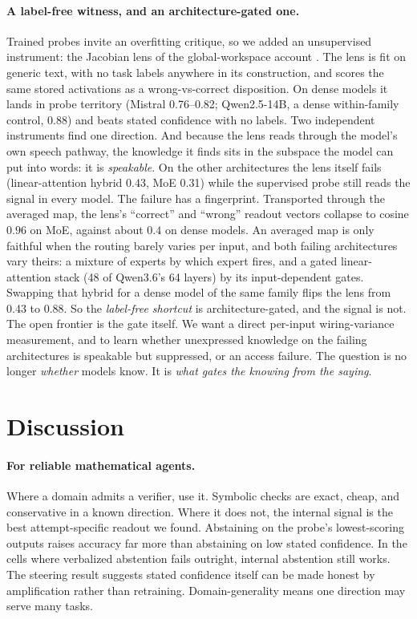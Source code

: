 \documentclass{article}
\begin{document}
\paragraph{A label-free witness, and an architecture-gated one.}
Trained probes invite an overfitting critique, so we added an unsupervised instrument: the Jacobian lens of the global-workspace account \citep{gurnee2026workspace}.
The lens is fit on generic text, with no task labels anywhere in its construction, and scores the same stored activations as a wrong-vs-correct disposition.
On dense models it lands in probe territory (Mistral 0.76--0.82; Qwen2.5-14B, a dense within-family control, 0.88) and beats stated confidence with no labels.
Two independent instruments find one direction.
And because the lens reads through the model's own speech pathway, the knowledge it finds sits in the subspace the model can put into words: it is \emph{speakable}.
On the other architectures the lens itself fails (linear-attention hybrid 0.43, MoE 0.31) while the supervised probe still reads the signal in every model.
The failure has a fingerprint.
Transported through the averaged map, the lens's ``correct'' and ``wrong'' readout vectors collapse to cosine $0.96$ on MoE, against about $0.4$ on dense models.
An averaged map is only faithful when the routing barely varies per input, and both failing architectures vary theirs: a mixture of experts by which expert fires, and a gated linear-attention stack (48 of Qwen3.6's 64 layers) by its input-dependent gates.
Swapping that hybrid for a dense model of the same family flips the lens from 0.43 to 0.88.
So the \emph{label-free shortcut} is architecture-gated, and the signal is not.
The open frontier is the gate itself.
We want a direct per-input wiring-variance measurement, and to learn whether unexpressed knowledge on the failing architectures is speakable but suppressed, or an access failure.
The question is no longer \emph{whether} models know.
It is \emph{what gates the knowing from the saying}.

\section{Discussion}
\label{sec:discussion}

\paragraph{For reliable mathematical agents.}
Where a domain admits a verifier, use it.
Symbolic checks are exact, cheap, and conservative in a known direction.
Where it does not, the internal signal is the best attempt-specific readout we found.
Abstaining on the probe's lowest-scoring outputs raises accuracy far more than abstaining on low stated confidence.
In the cells where verbalized abstention fails outright, internal abstention still works.
The steering result suggests stated confidence itself can be made honest by amplification rather than retraining.
Domain-generality means one direction may serve many tasks.
\end{document}
